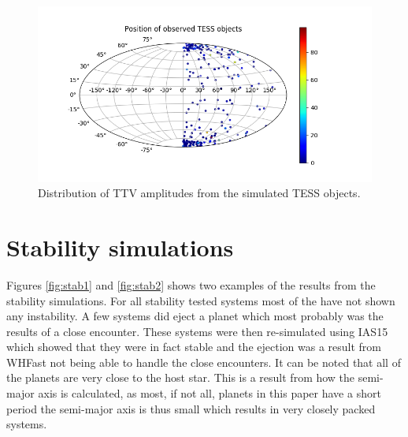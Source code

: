\documentclass[12pt]{report}
\begin{document}
\begin{figure}[h!]
 	 \centering
	  \includegraphics[width=\textwidth]{img/skymap_TESS_wrap_cutoff.png}
	  \caption{Distribution of TTV amplitudes from the simulated TESS objects.}
	 \label{fig:skymap_amp}
\end{figure}
\section{Stability simulations}
	Figures \ref{fig:stab1} and \ref{fig:stab2} shows two examples of the results from the stability simulations. For all stability tested systems most of the have not shown any instability. A few systems did eject a planet which most probably was the results of a close encounter. These systems were then re-simulated using IAS15 which showed that they were in fact stable and the ejection was a result from WHFast not being able to handle the close encounters. It can be noted that all of the planets are very close to the host star. This is a result from how the semi-major axis is calculated, as most, if not all, planets in this paper have a short period the semi-major axis is thus small which results in very closely packed systems.
\end{document}

